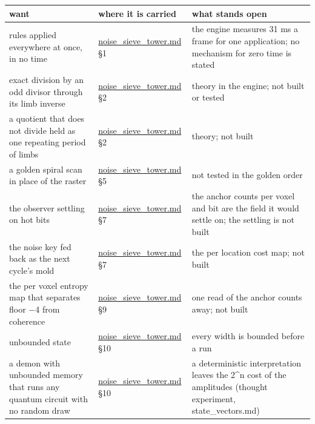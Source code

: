 {\small
\setlength{\tabcolsep}{6pt}
\begin{longtable}{>{\RaggedRight\arraybackslash}p{}>{\RaggedRight\arraybackslash}p{}>{\RaggedRight\arraybackslash}p{}}
\toprule
want & where it is carried & what stands open \\
\midrule
\endhead
rules applied everywhere at once, in no time & \hyperref[chap:noise-sieve-tower]{noise\_\allowbreak{}sieve\_\allowbreak{}tower.md} §1 & the engine measures 31 ms a frame for one application; no mechanism for zero time is stated \\
exact division by an odd divisor through its limb inverse & \hyperref[chap:noise-sieve-tower]{noise\_\allowbreak{}sieve\_\allowbreak{}tower.md} §2 & theory in the engine; not built or tested \\
a quotient that does not divide held as one repeating period of limbs & \hyperref[chap:noise-sieve-tower]{noise\_\allowbreak{}sieve\_\allowbreak{}tower.md} §2 & theory; not built \\
a golden spiral scan in place of the raster & \hyperref[chap:noise-sieve-tower]{noise\_\allowbreak{}sieve\_\allowbreak{}tower.md} §5 & not tested in the golden order \\
the observer settling on hot bits & \hyperref[chap:noise-sieve-tower]{noise\_\allowbreak{}sieve\_\allowbreak{}tower.md} §7 & the anchor counts per voxel and bit are the field it would settle on; the settling is not built \\
the noise key fed back as the next cycle's mold & \hyperref[chap:noise-sieve-tower]{noise\_\allowbreak{}sieve\_\allowbreak{}tower.md} §7 & the per location cost map; not built \\
the per voxel entropy map that separates floor −4 from coherence & \hyperref[chap:noise-sieve-tower]{noise\_\allowbreak{}sieve\_\allowbreak{}tower.md} §9 & one read of the anchor counts away; not built \\
unbounded state & \hyperref[chap:noise-sieve-tower]{noise\_\allowbreak{}sieve\_\allowbreak{}tower.md} §10 & every width is bounded before a run \\
a demon with unbounded memory that runs any quantum circuit with no random draw & \hyperref[chap:noise-sieve-tower]{noise\_\allowbreak{}sieve\_\allowbreak{}tower.md} §10 & a deterministic interpretation leaves the 2\textasciicircum{}n cost of the amplitudes (thought experiment, state\_\allowbreak{}vectors.md) \\

\end{longtable}}
